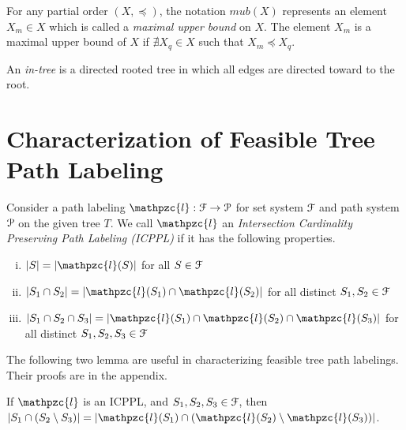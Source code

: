 \documentclass[a4paper,UKenglish,numberwithinsect]{lipics} %
\def\cF{{\cal F}}
\def\cP{{\cal P}}
\def\cl{\mathpzc{l}}
\begin{document}
\noindent
For any partial order $(X, \preccurlyeq)$,  the notation $mub(X)$
represents an element $X_m \in X$ which is called
a {\em maximal upper bound} on $X$.  The element $X_m$ is a maximal upper bound of
$X$ if $\nexists X_q \in X$ such that $X_m \preccurlyeq X_q$. 

\noindent
An {\em in-tree} is a directed rooted tree in which all edges are
directed toward to the root.

\section{Characterization of Feasible Tree Path  Labeling} 
\label{sec:feasible} 

Consider a path labeling $\cl: \cF \rightarrow \cP$ for set system $\cF$
and path system $\cP$ on the given tree $T$. We
call $\cl$ an {\em Intersection Cardinality Preserving Path Labeling
  (ICPPL)} if it has the following properties.
\begin{enumerate}[i. ]
\item $|S| = |\cl(S)|$ for all $S \in \cF$
\item $|S_1 \cap S_2| = |\cl(S_1) \cap \cl(S_2)|$ for all
  distinct $S_1, S_2 \in \cF$
\item $|S_1 \cap S_2 \cap S_3| = |\cl(S_1) \cap \cl(S_2) \cap
  \cl(S_3)|$ for all distinct  $S_1, S_2, S_3 \in \cF$
\end{enumerate}
The following two lemma are useful in characterizing feasible tree path labelings.  Their
proofs are in the appendix.
\begin{lemma}
  \label{lem:setminuscard}
  If $\cl$ is an ICPPL, and $S_1, S_2, S_3 \in \cF$, then $|S_1 \cap
  (S_2 \setminus S_3)| = |\cl(S_1) \cap (\cl(S_2) \setminus
  \cl(S_3))|$.
\end{lemma}
 
\end{document}
